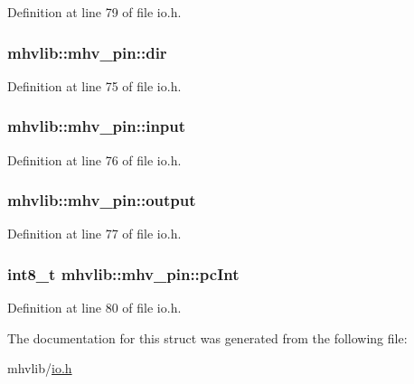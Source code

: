 Definition at line 79 of file io.\-h.

\hypertarget{structmhvlib_1_1mhv__pin_a4cdeb5c913db830d7041d8588f0220b4}{
\subsubsection[{dir}]{ mhvlib\-::mhv\-\_\-pin\-::dir}}\label{structmhvlib_1_1mhv__pin_a4cdeb5c913db830d7041d8588f0220b4}


Definition at line 75 of file io.\-h.

\hypertarget{structmhvlib_1_1mhv__pin_a714e8ba9089324e8aba7d0a93af2f126}{
\subsubsection[{input}]{ mhvlib\-::mhv\-\_\-pin\-::input}}\label{structmhvlib_1_1mhv__pin_a714e8ba9089324e8aba7d0a93af2f126}


Definition at line 76 of file io.\-h.

\hypertarget{structmhvlib_1_1mhv__pin_a27aade45241ec98899980d32c3d75e43}{
\subsubsection[{output}]{ mhvlib\-::mhv\-\_\-pin\-::output}}\label{structmhvlib_1_1mhv__pin_a27aade45241ec98899980d32c3d75e43}


Definition at line 77 of file io.\-h.

\hypertarget{structmhvlib_1_1mhv__pin_a37fbac008573b56a6d8b286a147b59ea}{
\subsubsection[{pc\-Int}]{\setlength{\rightskip}{0pt plus 5cm}int8\-\_\-t mhvlib\-::mhv\-\_\-pin\-::pc\-Int}}\label{structmhvlib_1_1mhv__pin_a37fbac008573b56a6d8b286a147b59ea}


Definition at line 80 of file io.\-h.



The documentation for this struct was generated from the following file\-:\begin{DoxyCompactItemize}
\item 
mhvlib/\hyperlink{io_8h}{io.\-h}\end{DoxyCompactItemize}
